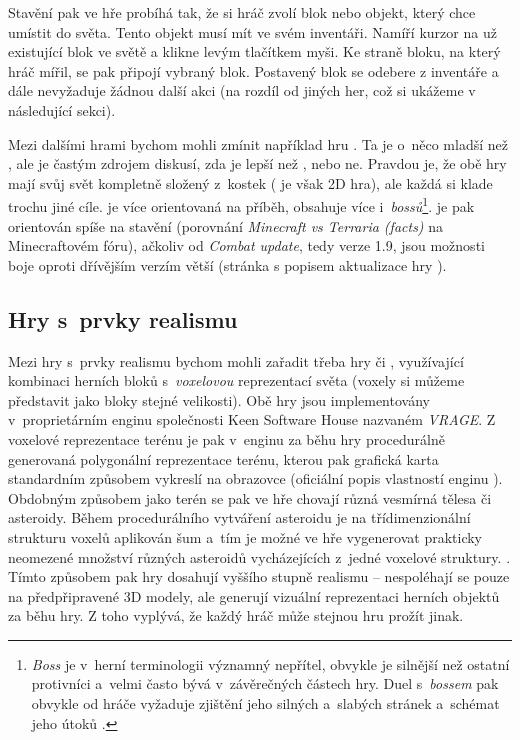 \FloatBarrier

Stavění pak ve hře probíhá tak, že si hráč zvolí blok nebo objekt, který chce umístit do světa. Tento objekt musí mít ve svém inventáři. Namíří kurzor na už existující blok ve světě a klikne levým tlačítkem myši. Ke straně bloku, na který hráč mířil, se pak připojí vybraný blok. Postavený blok se odebere z inventáře a dále nevyžaduje žádnou další akci (na rozdíl od jiných her, což si ukážeme v následující sekci).


Mezi dalšími hrami bychom mohli zmínit například hru \TE{}. Ta je o~něco mladší než \MC{}, ale je častým zdrojem diskusí, zda je lepší než \MC{}, nebo ne. Pravdou je, že obě hry mají svůj svět kompletně složený z~kostek (\TE{} je však 2D hra), ale každá si klade trochu jiné cíle. \TE{} je více orientovaná na příběh, obsahuje více \NPC{} i~\textit{bossů}\footnote{\textit{Boss} je v~herní terminologii významný nepřítel, obvykle je silnější než ostatní protivníci a~velmi často bývá v~závěrečných částech hry. Duel s~\textit{bossem} pak obvykle od hráče vyžaduje zjištění jeho silných a~slabých stránek a~schémat jeho útoků \citep{intro_boss}.}. \MC{} je pak orientován spíše na stavění (porovnání \textit{Minecraft vs Terraria (facts)} \citep{mc_te_comparsion} na Minecraftovém fóru), ačkoliv od \textit{Combat update}, tedy verze 1.9, jsou možnosti boje oproti dřívějším verzím větší (stránka s popisem aktualizace hry \citep{mc_combat}).  


\subsection{Hry s~prvky realismu}

Mezi hry s~prvky realismu bychom mohli zařadit třeba hry \SE{} či \ME{}, využívající kombinaci herních bloků s~\textit{voxelovou} reprezentací světa (voxely si můžeme představit jako bloky stejné velikosti). Obě hry jsou implementovány v~proprietárním enginu společnosti Keen Software House nazvaném \textit{VRAGE}\texttrademark{}. Z voxelové reprezentace terénu je pak v~enginu za běhu hry procedurálně generovaná polygonální reprezentace terénu, kterou pak grafická karta standardním způsobem vykreslí na obrazovce (oficiální popis vlastností enginu \citep{vrage}). Obdobným způsobem jako terén se pak ve hře \SE{} chovají různá vesmírná tělesa či asteroidy. Během procedurálního vytváření asteroidu je na třídimenzionální strukturu voxelů  aplikován šum a~tím je možné ve hře vygenerovat prakticky neomezené množství různých asteroidů vycházejících z~jedné voxelové struktury.  \citep{rosa_blog}. Tímto způsobem pak hry dosahují vyššího stupně realismu -- nespoléhají se pouze na předpřipravené 3D modely, ale generují vizuální reprezentaci herních objektů za běhu hry. Z toho vyplývá, že každý hráč může stejnou hru prožít jinak. 

